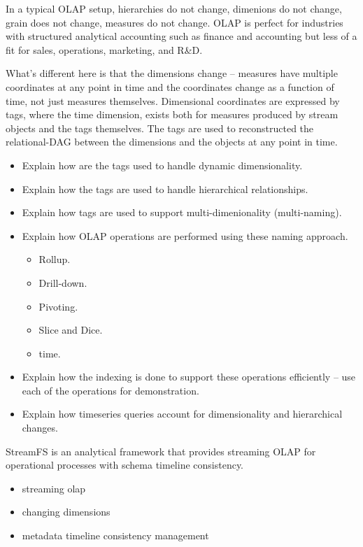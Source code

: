 In a typical OLAP setup, hierarchies do not change, dimenions do not change, grain does not change, measures do not change.
OLAP is perfect for industries with structured analytical accounting such as finance and accounting but less of a fit for
sales, operations, marketing, and R\&D.



What's different here is that the dimensions change -- measures have multiple coordinates at any point in time and the coordinates
change as a function of time, not just measures themselves.  Dimensional coordinates are expressed by tags, where the time dimension,
exists both for measures produced by stream objects and the tags themselves.  The tags are used to reconstructed the relational-DAG
between the dimensions and the objects at any point in time.


\begin{itemize}
\item Explain how are the tags used to handle dynamic dimensionality.
\item Explain how the tags are used to handle hierarchical relationships.
\item Explain how tags are used to support multi-dimenionality (multi-naming).
\item Explain how OLAP operations are performed using these naming approach.
	\begin{itemize}
	\item Rollup.
	\item Drill-down.
	\item Pivoting.
	\item Slice and Dice.
	\item time.
	\end{itemize}
\item Explain how the indexing is done to support these operations efficiently -- use each of the operations for demonstration.
\item Explain how timeseries queries account for dimensionality and hierarchical changes.
\end{itemize}


StreamFS is an analytical framework that provides streaming OLAP for operational processes with schema timeline consistency.
\begin{itemize}
\item streaming olap
\item changing dimensions
\item metadata timeline consistency management
\end{itemize}






